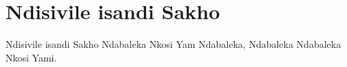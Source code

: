 \starttocol
\chapter{Ndisivile isandi Sakho}
\nexttocol
\hfill{\it }
\stoptocol
\starttocol
\startlines
{\sc Ndisivile} isandi Sakho
Ndabaleka Nkosi Yam
Ndabaleka, Ndabaleka
Ndabaleka Nkosi Yami.
\stoplines
\nexttocol

\stoptocol
